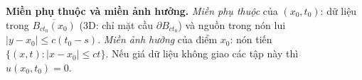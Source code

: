 \textbf{Miền phụ thuộc và miền ảnh hưởng.}
\emph{Miền phụ thuộc} của $(x_0,t_0)$: dữ liệu trong $\overline{B_{ct_0}(x_0)}$ (3D: chỉ mặt cầu $\partial B_{ct_0}$) và nguồn trong nón lui $|y-x_0|\le c(t_0-s)$.
\emph{Miền ảnh hưởng} của điểm $x_0$: nón tiến $\{(x,t):|x-x_0|\le ct\}$.
Nếu giá dữ liệu không giao các tập này thì $u(x_0,t_0)=0$.
